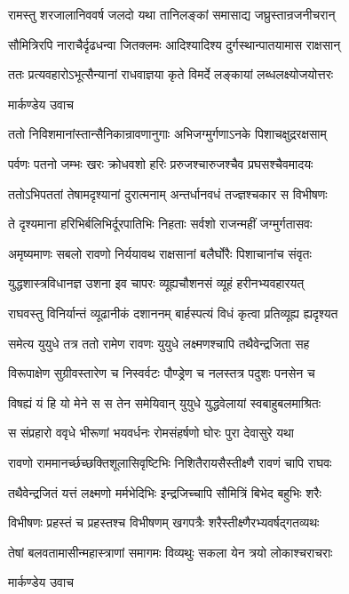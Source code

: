 \twolineshloka
{रामस्तु शरजालानिववर्ष जलदो यथा}
{तानिलङ्कां समासाद्य जघ्रुस्तान्रजनीचरान्}


\twolineshloka
{सौमित्रिरपि नाराचैर्दृढधन्वा जितक्लमः}
{आदिश्यादिश्य दुर्गस्थान्पातयामास राक्षसान्}


\twolineshloka
{ततः प्रत्यवहारोऽभूत्सैन्यानां राधवाज्ञया}
{कृते विमर्दे लङ्कायां लब्धलक्ष्योजयोत्तरः}


\twolineshloka
{मार्कण्डेय उवाच}
{}


\twolineshloka
{ततो निविशमानांस्तान्सैनिकान्रावणानुगाः}
{अभिजग्मुर्गणाऽनके पिशाचक्षुद्ररक्षसाम्}


\twolineshloka
{पर्वणः पतनो जम्भः खरः क्रोधवशो हरिः}
{प्ररुजश्चारुजश्चैव प्रघसश्चैवमादयः}


\twolineshloka
{ततोऽभिपततां तेषामदृश्यानां दुरात्मनाम्}
{अन्तर्धानवधं तज्ज्ञश्चकार स विभीषणः}


\twolineshloka
{ते दृश्यमाना हरिभिर्बलिभिर्दूरपातिभिः}
{निहताः सर्वशो राजन्महीं जग्मुर्गतासवः}


\twolineshloka
{अमृष्यमाणः सबलो रावणो निर्ययावथ}
{राक्षसानां बलैर्घोरैः पिशाचानांच संवृतः}


\twolineshloka
{युद्धशास्त्रविधानज्ञ उशना इव चापरः}
{व्यूह्यचौशनसं व्यूहं हरीनभ्यवहारयत्}


\twolineshloka
{राघवस्तु विनिर्यान्तं व्यूढानीकं दशाननम्}
{बार्हस्पत्यं विधं कृत्वा प्रतिव्यूह्य ह्यदृश्यत}


\twolineshloka
{समेत्य युयुधे तत्र ततो रामेण रावणः}
{युयुधे लक्ष्मणश्चापि तथैवेन्द्रजिता सह}


\twolineshloka
{विरूपाक्षेण सुग्रीवस्तारेण च निस्वर्वटः}
{पौण्ड्रेण च नलस्तत्र पदुशः पनसेन च}


\twolineshloka
{विषह्यं यं हि यो मेने स स तेन समेयिवान्}
{युयुधे युद्धवेलायां स्वबाहुबलमाश्रितः}


\twolineshloka
{स संप्रहारो ववृधे भीरूणां भयवर्धनः}
{रोमसंहर्षणो घोरः पुरा देवासुरे यथा}


\twolineshloka
{रावणो राममानर्च्छच्छक्तिशूलासिवृष्टिभिः}
{निशितैरायसैस्तीक्ष्णै रावणं चापि राघवः}


\twolineshloka
{तथैवेन्द्रजितं यत्तं लक्ष्मणो मर्मभेदिभिः}
{इन्द्रजिच्चापि सौमित्रिं बिभेद बहुभिः शरैः}


\twolineshloka
{विभीषणः प्रहस्तं च प्रहस्तश्च विभीषणम्}
{खगपत्रैः शरैस्तीक्ष्णैरभ्यवर्षद्गतव्यथः}


\twolineshloka
{तेषां बलवतामासीन्महास्त्राणां समागमः}
{विव्यथुः सकला येन त्रयो लोकाश्चराचराः}


\twolineshloka
{मार्कण्डेय उवाच}
{}


